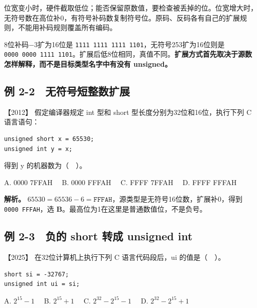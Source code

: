 位宽变小时，硬件截取低位；能否保留原数值，要检查被丢掉的位。位宽增大时，无符号数在高位补0，有符号补码数复制符号位。原码、反码各有自己的扩展规则，不能用补码规则覆盖所有编码。

8位补码−3扩为16位是 \texttt{1111\ 1111\ 1111\ 1101}，无符号253扩为16位则是 \texttt{0000\ 0000\ 1111\ 1101}。扩展后低8位相同，真值不同。\textbf{扩展方式首先取决于源数怎样解释，而不是目标类型名字中有没有 unsigned。}

\subsection{例 2-2　无符号短整数扩展}\label{co-ex2-2}

\noindent{}【2012】 假定编译器规定 int 型和 short 型长度分别为32位和16位，执行下列 C 语言语句：

\par\medskip\noindent
\begin{minipage}{\linewidth}
\begin{verbatim}
unsigned short x = 65530;
unsigned int y = x;
\end{verbatim}
\end{minipage}\par\medskip

得到 y 的机器数为（　）。

A. 0000 7FFAH　 B. 0000 FFFAH　 C. FFFF 7FFAH　 D. FFFF FFFAH


\textbf{解析。} \(65530=65536-6=\mathtt{FFFAH}\)，源类型是无符号16位数，扩展补0，得到 \texttt{0000\ FFFAH}，选 \textbf{B}。最高位为1在这里是普通数值位，不是负号。

\subsection{例 2-3　负的 short 转成 unsigned int}\label{co-ex2-3}

\noindent{}【2025】 在32位计算机上执行下列 C 语言代码段后，ui 的值是（　）。

\par\medskip\noindent
\begin{minipage}{\linewidth}
\begin{verbatim}
short si = -32767;
unsigned int ui = si;
\end{verbatim}
\end{minipage}\par\medskip

A. \(2^{15}-1\)　 B. \(2^{15}+1\)　 C. \(2^{32}-2^{15}-1\)　 D. \(2^{32}-2^{15}+1\)

